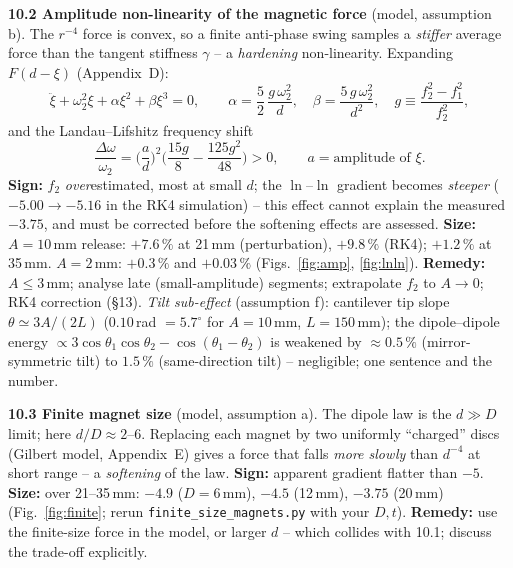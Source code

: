 \documentclass[11pt,a4paper]{article}
\newcommand{\sign}[1]{\textbf{Sign:} #1}
\newcommand{\size}[1]{\textbf{Size:} #1}
\newcommand{\remedy}[1]{\textbf{Remedy:} #1}
\begin{document}
\textbf{10.2 Amplitude non-linearity of the magnetic force} (model, assumption b). The
$r^{-4}$ force is convex, so a finite anti-phase swing samples a \emph{stiffer} average force
than the tangent stiffness $\gamma$ -- a \emph{hardening} non-linearity. Expanding
$F(d-\xi)$ (Appendix~D):
\begin{equation}
  \ddot\xi+\omega_2^2\xi+\alpha\xi^2+\beta\xi^3=0,\qquad
  \alpha=\frac52\,\frac{g\,\omega_2^2}{d},\quad \beta=\frac{5\,g\,\omega_2^2}{d^2},\quad
  g\equiv\frac{f_2^2-f_1^2}{f_2^2},
\end{equation}
and the Landau--Lifshitz frequency shift
\begin{equation}
  \frac{\Delta\omega}{\omega_2}=\Big(\frac{a}{d}\Big)^2\Big(\frac{15g}{8}-\frac{125g^2}{48}\Big)>0,
  \qquad a=\text{amplitude of }\xi .
\end{equation}
\sign{$f_2$ \emph{over}estimated, most at small $d$; the $\ln$--$\ln$ gradient becomes
\emph{steeper} ($-5.00\to-5.16$ in the RK4 simulation) -- this effect cannot explain the
measured $-3.75$, and must be corrected before the softening effects are assessed.}
\size{$A=10$\,mm release: $+7.6\,\%$ at 21\,mm (perturbation), $+9.8\,\%$ (RK4);
$+1.2\,\%$ at 35\,mm. $A=2$\,mm: $+0.3\,\%$ and $+0.03\,\%$ (Figs.~\ref{fig:amp},
\ref{fig:lnln}).}
\remedy{$A\le3$\,mm; analyse late (small-amplitude) segments; extrapolate $f_2$ to $A\to0$;
RK4 correction (\S13).}
\emph{Tilt sub-effect} (assumption f): cantilever tip slope $\theta\simeq3A/(2L)$
($0.10$\,rad $=5.7^\circ$ for $A=10$\,mm, $L=150$\,mm); the dipole--dipole energy
$\propto3\cos\theta_1\cos\theta_2-\cos(\theta_1-\theta_2)$ is weakened by
$\approx0.5\,\%$ (mirror-symmetric tilt) to $1.5\,\%$ (same-direction tilt) -- negligible; one
sentence and the number.

\textbf{10.3 Finite magnet size} (model, assumption a). The dipole law is the $d\gg D$ limit;
here $d/D\approx2$--6. Replacing each magnet by two uniformly ``charged'' discs (Gilbert
model, Appendix~E) gives a force that falls \emph{more slowly} than $d^{-4}$ at short range --
a \emph{softening} of the law. \sign{apparent gradient flatter than $-5$.}
\size{over 21--35\,mm: $-4.9$ ($D=6$\,mm), $-4.5$ (12\,mm), $-3.75$ (20\,mm)
(Fig.~\ref{fig:finite}; rerun \texttt{finite\_size\_magnets.py} with your $D,t$).}
\remedy{use the finite-size force in the model, or larger $d$ -- which collides with 10.1;
discuss the trade-off explicitly.}
\end{document}
